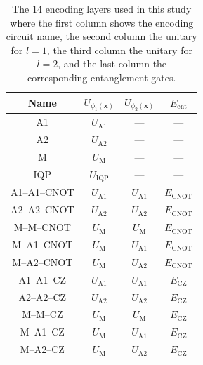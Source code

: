 \documentclass[journal=jacsat,manuscript=article]{achemso}
\begin{document}
\begin{table}[htbp]
	\centering
	\begin{tabular}{|c|c|c|c|}
		\hline
		\textbf{Name} & $U_{\phi_{1}(\mathbf{x})}$ & $U_{\phi_{2}(\mathbf{x})}$ & $E_{\text{ent}}$  \\
		\hline
		\hline
		A1 & $U_{\text{A1}}$ & --- & --- \\
		\hline
		A2 & $U_{\text{A2}}$ & --- & --- \\
		\hline		
		M & $U_{\text{M}}$ & --- & --- \\
		\hline
		IQP & $U_{\text{IQP}}$ & --- & --- \\
		\hline
		A1--A1--CNOT & $U_{\text{A1}}$ & $U_{\text{A1}}$ & $E_{\text{CNOT}}$ \\
		\hline
		 A2--A2--CNOT & $U_{\text{A2}}$ & $U_{\text{A2}}$ & $E_{\text{CNOT}}$ \\
		\hline
		M--M--CNOT & $U_{\text{M}}$ & $U_{\text{M}}$ & $E_{\text{CNOT}}$ \\
		\hline
		M--A1--CNOT & $U_{\text{M}}$ & $U_{\text{A1}}$ & $E_{\text{CNOT}}$ \\
		\hline		
		M--A2--CNOT & $U_{\text{M}}$ & $U_{\text{A2}}$ & $E_{\text{CNOT}}$ \\
		\hline				
		A1--A1--CZ & $U_{\text{A1}}$ & $U_{\text{A1}}$ & $E_{\text{CZ}}$ \\
		\hline
		A2--A2--CZ& $U_{\text{A2}}$ & $U_{\text{A2}}$ & $E_{\text{CZ}}$ \\
		\hline
		M--M--CZ & $U_{\text{M}}$ & $U_{\text{M}}$ & $E_{\text{CZ}}$ \\
		\hline
		M--A1--CZ & $U_{\text{M}}$ & $U_{\text{A1}}$ & $E_{\text{CZ}}$ \\
		\hline		
		M--A2--CZ & $U_{\text{M}}$ & $U_{\text{A2}}$ & $E_{\text{CZ}}$ \\
		\hline						
	\end{tabular}
	\caption{The 14 encoding layers used in this study where the first column shows the encoding circuit name, the second column the unitary for $l=1$, the third column the unitary for $l=2$, and the last column the corresponding entanglement gates.}
	\label{tab:encoders}
\end{table}
\end{document}
